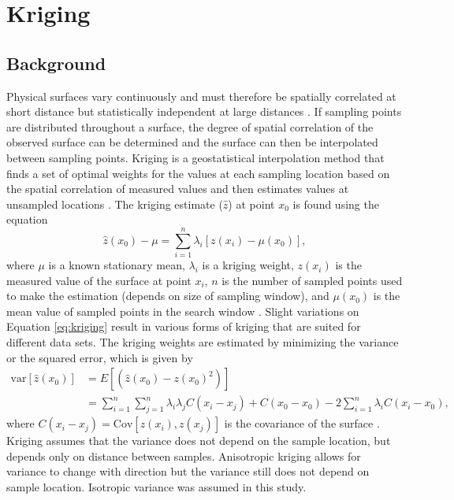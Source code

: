 \documentclass[12pt]{article}
\begin{document}
\section{Kriging}
\label{sec:kriging}

\subsection{Background}

Physical surfaces vary continuously and must therefore be spatially correlated at short distance but statistically independent at large distances \citep{Davis1986}. If sampling points are distributed throughout a surface, the degree of spatial correlation of the observed surface can be determined and the surface can then be interpolated between sampling points. Kriging is a geostatistical interpolation method that finds a set of optimal weights for the values at each sampling location based on the spatial correlation of measured values and then estimates values at unsampled locations \citep{Davis1986, Li2014}. The kriging estimate ($\hat{z}$) at point $x_0$ is found using the equation
\begin{equation}
\label{eq:kriging}
\hat{z}(x_0) - \mu = \sum_{i=1}^{n} \lambda_i [z(x_i)-\mu(x_0)],
\end{equation}
where $\mu$ is a known stationary mean, $\lambda_i$ is a kriging weight, $z(x_i)$ is the measured value of the surface at point $x_i$, $n$ is the number of sampled points used to make the estimation (depends on size of sampling window), and $\mu(x_0)$ is the mean value of sampled points in the search window \citep{Wackernagel2003, Li2008}. Slight variations on Equation \ref{eq:kriging} result in various forms of kriging that are suited for different data sets. The kriging weights are estimated by minimizing the variance or the squared error, which is given by
\begin{align}
\mathrm{var}[\hat{z}(x_0)] &= E[(\hat{z}(x_0)-z(x_0)^2)]\\
&=\sum_{i=1}^{n}\sum_{j=1}^{n}\lambda_i \lambda_j C(x_i-x_j)+C(x_0-x_0)-2 \sum_{i=1}^{n} \lambda_i C(x_i-x_0),
\end{align}
where $C(x_i-x_j) = \mathrm{Cov}[z(x_i),z(x_j)]$ is the covariance of the surface \citep{Li2008}. Kriging assumes that the variance does not depend on the sample location, but depends only on distance between samples.  Anisotropic kriging allows for variance to change with direction but the variance still does not depend on sample location. Isotropic variance was assumed in this study.
\end{document}
